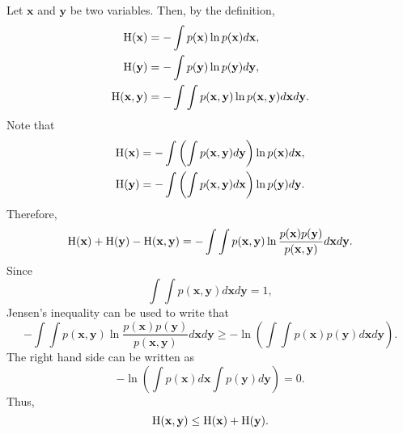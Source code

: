\subsection{}
\label{1.31}
Let $\mathbf{x}$ and $\mathbf{y}$ be two variables.
Then, by the definition, 
%
\begin{equation}
\begin{aligned}
{\rm H}(\mathbf{x}) &= - \int p(\mathbf{x}) \ln p(\mathbf{x}) d\mathbf{x}, \\
{\rm H}(\mathbf{y}) &= - \int p(\mathbf{y}) \ln p(\mathbf{y}) d\mathbf{y}, \\
{\rm H}(\mathbf{x}, \mathbf{y}) &= - \int \int p(\mathbf{x}, \mathbf{y}) \ln p(\mathbf{x}, \mathbf{y}) d\mathbf{x} d\mathbf{y}.
\end{aligned}
\end{equation}
%
Note that
%
\begin{equation}
\begin{aligned}
{\rm H}(\mathbf{x}) &= - \int \left( \int p(\mathbf{x}, \mathbf{y}) d\mathbf{y} \right) \ln p(\mathbf{x}) d\mathbf{x}, \\
{\rm H}(\mathbf{y}) &= - \int \left( \int p(\mathbf{x}, \mathbf{y}) d\mathbf{x} \right) \ln p(\mathbf{y}) d\mathbf{y}.
\end{aligned}
\end{equation}
%
Therefore,
%
\begin{equation}
{\rm H}(\mathbf{x}) + {\rm H}(\mathbf{y}) - {\rm H}(\mathbf{x}, \mathbf{y}) = - \int \int p(\mathbf{x}, \mathbf{y}) \ln \frac{p(\mathbf{x}) p(\mathbf{y})}{p(\mathbf{x}, \mathbf{y})} d\mathbf{x} d\mathbf{y}.
\end{equation}
%
Since
%
\begin{equation}
\int \int p(\mathbf{x}, \mathbf{y}) d\mathbf{x} d\mathbf{y} = 1,
\end{equation}
%
Jensen's inequality can be used to write that
%
\begin{equation}
- \int \int p(\mathbf{x}, \mathbf{y}) \ln \frac{p(\mathbf{x}) p(\mathbf{y})}{p(\mathbf{x}, \mathbf{y})} d\mathbf{x} d\mathbf{y} \geq - \ln \left( \int \int p(\mathbf{x}) p(\mathbf{y}) d\mathbf{x} d\mathbf{y} \right).
\end{equation}
%
The right hand side can be written as
%
\begin{equation}
- \ln \left( \int p(\mathbf{x}) d\mathbf{x} \int  p(\mathbf{y}) d\mathbf{y} \right) = 0.
\end{equation}
%
Thus,
%
\begin{equation}
{\rm H}(\mathbf{x}, \mathbf{y}) \leq {\rm H}(\mathbf{x}) + {\rm H}(\mathbf{y}).
\end{equation}
%


